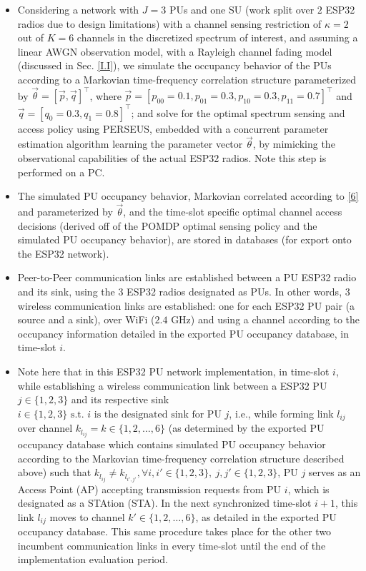 \documentclass[12pt, draftcls, onecolumn]{IEEEtran}
\begin{document}
\begin{itemize}
    \item Considering a network with $J{=}3$ PUs and one SU (work split over $2$ ESP32 radios due to design limitations) with a channel sensing restriction of $\kappa{=}2$ out of $K{=}6$ channels in the discretized spectrum of interest, and assuming a linear AWGN observation model, with a Rayleigh channel fading model (discussed in Sec. \ref{I.I}), we simulate the occupancy behavior of the PUs according to a Markovian time-frequency correlation structure parameterized by $\vec{\theta}{=}[\vec{p},\vec{q}]^{\intercal}$, where $\vec{p}{=}[p_{00}{=}0.1,p_{01}{=}0.3,p_{10}{=}0.3,p_{11}{=}0.7]^{\intercal}$
     and $\vec{q}{=}[q_{0}{=}0.3,q_{1}{=}0.8]^{\intercal}$; and solve for the optimal spectrum sensing and access policy using PERSEUS, embedded with a concurrent parameter estimation algorithm learning the parameter vector $\vec{\theta}$, by mimicking the observational capabilities of the actual ESP32 radios. Note this step is performed on a PC.
    \item The simulated PU occupancy behavior, Markovian correlated according to \eqref{6} and parameterized by $\vec{\theta}$, and the time-slot specific optimal channel access decisions (derived off of the POMDP optimal sensing policy and the simulated PU occupancy behavior), are stored in databases (for export onto the ESP32 network).
    \item Peer-to-Peer communication links are established between a PU ESP32 radio and its sink, using the $3$ ESP32 radios designated as PUs. In other words, $3$ wireless communication links are established: one for each ESP32 PU pair (a source and a sink), over WiFi ($2.4$ GHz) and using a channel according to the occupancy information detailed in the exported PU occupancy database, in time-slot $i$.
    \item Note here that in this ESP32 PU network implementation, in time-slot $i$, while establishing a wireless communication link between a ESP32 PU $j{\in}\{1,2,3\}$ and its respective sink $i{\in}\{1,2,3\}\text{ s.t. }i\text{ is the designated sink for PU }j$, i.e., while forming link $l_{ij}$ over channel $k_{l_{ij}}{=}k{\in}\{1,2,\dots,6\}$ (as determined by the exported PU occupancy database which contains simulated PU occupancy behavior according to the Markovian time-frequency correlation structure described above) such that $k_{l_{ij}}{\neq}k_{l_{i',j'}},{\forall}i,i'{\in}\{1,2,3\},\ j,j'{\in}\{1,2,3\}$, PU $j$ serves as an Access Point (AP) accepting transmission requests from PU $i$, which is designated as a STAtion (STA). In the next synchronized time-slot $i+1$, this link $l_{ij}$ moves to channel $k'{\in}\{1,2,\dots,6\}$, as detailed in the exported PU occupancy database. This same procedure takes place for the other two incumbent communication links in every time-slot until the end of the implementation evaluation period.

\end{itemize}
\end{document}
